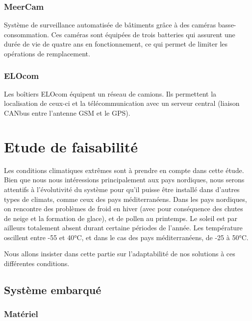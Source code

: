 \subsubsection{MeerCam}

Système de surveillance automatisée de bâtiments grâce à des caméras basse-consommation. Ces caméras sont équipées de trois batteries qui assurent une durée de vie de quatre ans en fonctionnement, ce qui permet de limiter les opérations de remplacement.

\subsubsection{ELOcom}

Les boîtiers ELOcom équipent un réseau de camions. Ils permettent la localisation de ceux-ci et la télécommunication avec un serveur central (liaison CANbus entre l’antenne GSM et le GPS).

\section{Etude de faisabilité}

Les conditions climatiques extrêmes sont à prendre en compte dans cette étude. Bien que nous nous intéressions principalement aux pays nordiques, nous serons attentifs à l’évolutivité du système pour qu’il puisse être installé dans d'autres types de climats, comme ceux des pays méditerranéens.
Dans les pays nordiques, on rencontre des problèmes de froid en hiver (avec pour conséquence des chutes de neige et la formation de glace), et de pollen au printemps. Le soleil est par ailleurs totalement absent durant certaine périodes de l’année. 
Les température oscillent entre -55 et 40°C, et dans le cas des pays méditerranéens, de -25 à 50°C.

Nous allons insister dans cette partie sur l'adaptabilité de nos solutions à ces différentes conditions.


\subsection{Système embarqué}

\subsubsection{Matériel}


